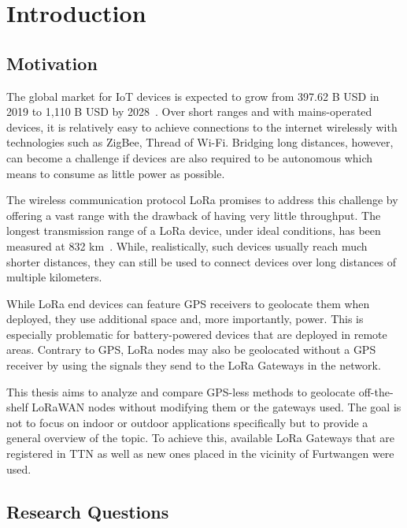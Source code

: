 \chapter{Introduction}

\section{Motivation}

The global market for \ac{IoT} devices is expected to grow from 397.62 B USD in 2019 to 1,110 B USD by 2028~\cite{grand_view_research_global_2022}.
Over short ranges and with mains-operated devices, it is relatively easy to achieve connections to the internet wirelessly with technologies such as ZigBee, Thread of Wi-Fi.
Bridging long distances, however, can become a challenge if devices are also required to be autonomous which means to consume as little power as possible.

The wireless communication protocol \ac{LoRa} promises to address this challenge by offering a vast range with the drawback of having very little throughput.
The longest transmission range of a \ac{LoRa} device, under ideal conditions, has been measured at 832 km~\cite{the_things_network_global_team_lora_nodate}.
While, realistically, such devices usually reach much shorter distances, they can still be used to connect devices over long distances of multiple kilometers.

While \ac{LoRa} end devices can feature \ac{GPS} receivers to geolocate them when deployed, they use additional space and, more importantly, power.
This is especially problematic for battery-powered devices that are deployed in remote areas.
Contrary to \ac{GPS}, \ac{LoRa} nodes may also be geolocated without a \ac{GPS} receiver by using the signals they send to the \ac{LoRa} Gateways in the network.

This thesis aims to analyze and compare \ac{GPS}-less methods to geolocate off-the-shelf \ac{LoRaWAN} nodes without modifying them or the gateways used.
The goal is not to focus on indoor or outdoor applications specifically but to provide a general overview of the topic.
To achieve this, available \ac{LoRa} Gateways that are registered in \acf{TTN} as well as new ones placed in the vicinity of Furtwangen were used.

\section{Research Questions}

